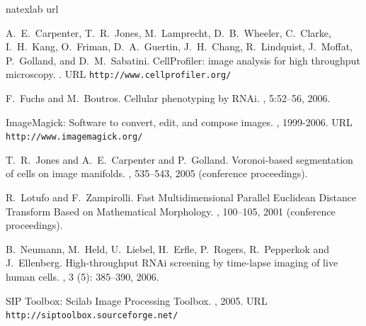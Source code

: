 \begin{thebibliography}{1}
\expandafter\ifx\csname natexlab\endcsname\relax\def\natexlab#1{#1}\fi
\expandafter\ifx\csname url\endcsname\relax
  \def\url#1{{\tt #1}}\fi

    A.~E.~Carpenter, T.~R.~Jones, M.~Lamprecht, D.~B.~Wheeler, C.~Clarke, I.~H.~Kang, O.~Friman, D.~A.~Guertin, J.~H.~Chang, R.~Lindquist, J.~Moffat, P.~Golland, and D.~M.~Sabatini.
    \newblock CellProfiler: image analysis for high throughput microscopy.
    .
    \newblock URL \url{http://www.cellprofiler.org/}

    F.~Fuchs and M.~Boutros.
    \newblock Cellular phenotyping by RNAi.
    , 5:52--56, 2006.

    ImageMagick: Software to convert, edit, and compose images.
    , 1999-2006.
    \newblock URL \url{http://www.imagemagick.org/}

    T.~R.~Jones and A.~E.~Carpenter and P.~Golland.
    \newblock Voronoi-based segmentation of cells on image manifolds.
    , 535--543, 2005 (conference proceedings).

    R.~Lotufo and F.~Zampirolli.
    \newblock Fast Multidimensional Parallel Euclidean Distance Transform Based on Mathematical Morphology.
    , 100--105, 2001 (conference proceedings).

    B.~Neumann, M.~Held, U.~Liebel, H.~Erfle, P.~Rogers, R.~Pepperkok and J.~Ellenberg.
    \newblock High-throughput RNAi screening by time-lapse imaging of live human cells.
    , 3 (5): 385--390, 2006.

    SIP Toolbox: Scilab Image Processing Toolbox.
    , 2005.
    \newblock URL \url{http://siptoolbox.sourceforge.net/}

\end{thebibliography}

\address{Oleg Sklyar and Wolfgang Huber\\
European Bioinformatics Institute (EMBL)\\
Wellcome Trust Genome Campus\\
Hinxton, Cambirdge\\
CB10 1SD\\
United Kingdom}


